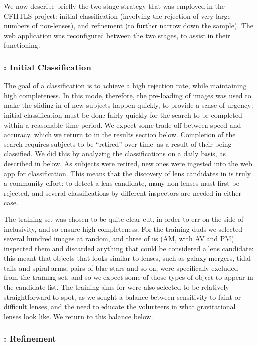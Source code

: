 \documentclass[useAMS,usenatbib,a4paper]{mn2e}
\begin{document}
We now describe briefly the two-stage strategy that was employed in the CFHTLS
project: initial classification (involving the rejection of very large numbers
of non-lenses), and refinement (to further narrow down the sample). The web
application was reconfigured between the two stages, to assist in their
functioning.

\subsubsection{\StageOne: Initial Classification}

The goal of a \StageOne classification is to achieve a high rejection rate,
while maintaining high completeness.  In this mode, therefore, the pre-loading
of images was used to make the sliding in of new subjects happen quickly, to
provide a sense of urgency: initial classification must be done fairly
quickly for the search to be completed within a reasonable time period.  We
expect some trade-off between speed and accuracy, which we return to in the
results section below. Completion of the search requires subjects to be
``retired'' over time, as a result of their being classified. We did this by
analyzing the classifications on a daily basis, as described in
 below. As subjects were retired, new ones were ingested into
the web app for classification. This means that the discovery of lens
candidates in \StageOne is truly a community effort: to detect a lens candidate,
many non-lenses must first be rejected, and several classifications by different inspectors are needed in either case.

The \StageOne training set was chosen to be quite clear cut, in order to err on
the side of inclusivity, and so ensure high completeness. For the training duds
we selected several hundred images at random, and three of us (AM, with AV and
PM) inspected them and discarded anything that could be considered a lens
candidate: this meant that objects that looks similar to lenses, such as galaxy
mergers, tidal tails and spiral arms, pairs of blue stars and so on, were
specifically excluded from the training set, and so we expect some of those
types of object to appear in the \StageOne candidate list. The training sims for
\StageOne were also selected to be relatively straightforward to spot, as we sought a balance between sensitivity to faint or difficult lenses, and the need to educate the volunteers in what gravitational lenses look like. We return to this balance below.


\subsubsection{\StageTwo: Refinement}
\end{document}
